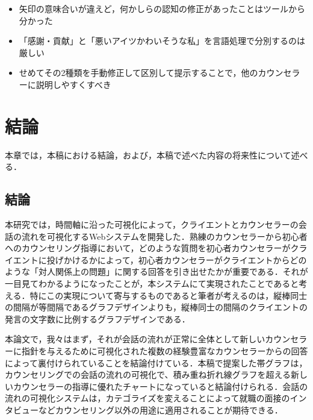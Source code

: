 \documentclass[shuuron]{kuee}
\begin{document}
\begin{itemize}

  \item 矢印の意味合いが違えど，何かしらの認知の修正があったことはツールから分かった
  \item 「感謝・貢献」と「悪いアイツかわいそうな私」を言語処理で分別するのは厳しい

  \item せめてその2種類を手動修正して区別して提示することで，他のカウンセラーに説明しやすくすべき

\end{itemize}
\chapter{結論}

本章では，本稿における結論，および，本稿で述べた内容の将来性について述べる．

\section{結論}

本研究では，時間軸に沿った可視化によって，クライエントとカウンセラーの会話の流れを可視化するWebシステムを開発した．熟練のカウンセラーから初心者へのカウンセリング指導において，どのような質問を初心者カウンセラーがクライエントに投げかけるかによって，初心者カウンセラーがクライエントからどのような「対人関係上の問題」に関する回答を引き出せたかが重要である．それが一目見てわかるようになったことが，本システムにて実現されたことであると考える．特にこの実現について寄与するものであると筆者が考えるのは，縦棒同士の間隔が等間隔であるグラフデザインよりも，縦棒同士の間隔のクライエントの発言の文字数に比例するグラフデザインである．




本論文で，我々はまず，それが会話の流れが正常に全体として新しいカウンセラーに指針を与えるために可視化された複数の経験豊富なカウンセラーからの回答によって裏付けられていることを結論付けている．本稿で提案した帯グラフは，カウンセリングでの会話の流れの可視化で、積み重ね折れ線グラフを超える新しいカウンセラーの指導に優れたチャートになっていると結論付けられる．会話の流れの可視化システムは，カテゴライズを変えることによって就職の面接のインタビューなどカウンセリング以外の用途に適用されることが期待できる．
\end{document}
